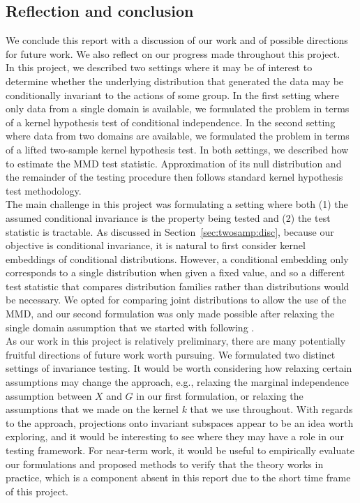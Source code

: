 \subsection{Reflection and conclusion} \label{sec:discussion}

We conclude this report with a discussion of our work and of possible directions for future work. We also reflect on our progress made throughout this project.
\\

In this project, we described two settings where it may be of interest to determine whether the underlying distribution that generated the data may be conditionally invariant to the actions of some group. In the first setting where only data from a single domain is available, we formulated the problem in terms of a kernel hypothesis test of conditional independence. In the second setting where data from two domains are available, we formulated the problem in terms of a lifted two-sample kernel hypothesis test. In both settings, we described how to estimate the MMD test statistic. Approximation of its null distribution and the remainder of the testing procedure then follows standard kernel hypothesis test methodology.
\\

The main challenge in this project was formulating a setting where both (1) the assumed conditional invariance is the property being tested and (2) the test statistic is tractable. As discussed in Section~\ref{sec:twosamp:disc}, because our objective is conditional invariance, it is natural to first consider kernel embeddings of conditional distributions. However, a conditional embedding only corresponds to a single distribution when given a fixed value, and so a different test statistic that compares distribution families rather than distributions would be necessary. We opted for comparing joint distributions to allow the use of the MMD, and our second formulation was only made possible after relaxing the single domain assumption that we started with following \textcite{Mouli:2021}.
\\

As our work in this project is relatively preliminary, there are many potentially fruitful directions of future work worth pursuing. We formulated two distinct settings of invariance testing. It would be worth considering how relaxing certain assumptions may change the approach, e.g., relaxing the marginal independence assumption between $X$ and $G$ in our first formulation, or relaxing the assumptions that we made on the kernel $k$ that we use throughout. With regards to the approach, projections onto invariant subspaces \parencite{Elesedy:2021:equivariant,Elesedy:2021,Mouli:2021} appear to be an idea worth exploring, and it would be interesting to see where they may have a role in our testing framework. For near-term work, it would be useful to empirically evaluate our formulations and proposed methods to verify that the theory works in practice, which is a component absent in this report due to the short time frame of this project.


